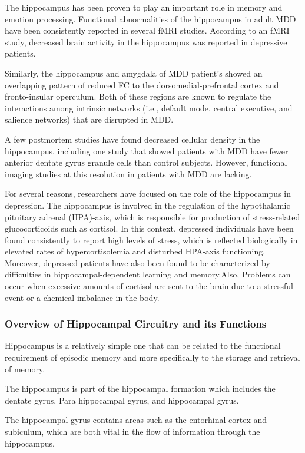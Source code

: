 \documentclass{article}
\begin{document}
The hippocampus has been proven to play an important role in memory
and emotion processing. Functional abnormalities of the hippocampus in
adult MDD have been consistently reported in several fMRI studies.
According to an fMRI study, decreased brain activity in the
hippocampus was reported in depressive patients.

Similarly, the hippocampus and amygdala of MDD patient’s showed an
overlapping pattern of reduced FC to the dorsomedial-prefrontal cortex
and fronto-insular operculum. Both of these regions are known to
regulate the interactions among intrinsic networks (i.e., default
mode, central executive, and salience networks) that are disrupted in
MDD.

A few postmortem studies have found decreased cellular density in the
hippocampus, including one study that showed patients with MDD have
fewer anterior dentate gyrus granule cells than control subjects.
However, functional imaging studies at this resolution in patients
with MDD are lacking.

For several reasons, researchers have focused on the role of the
hippocampus in depression. The  hippocampus is involved in the
regulation of the hypothalamic pituitary adrenal (HPA)-axis, which is
responsible for production of stress-related glucocorticoids such as
cortisol. In this context, depressed individuals have been found
consistently to report high levels of stress, which is reflected
biologically in elevated rates of hypercortisolemia and disturbed
HPA-axis functioning. Moreover, depressed patients have also been
found to be characterized by difficulties in hippocampal-dependent
learning  and  memory.Also, Problems  can occur  when excessive
amounts  of  cortisol  are  sent to  the  brain due  to  a stressful
event  or  a chemical imbalance in the body.

\subsubsection{Overview of Hippocampal Circuitry and its Functions}

Hippocampus is a relatively simple one that can be related to the
functional requirement of episodic memory and more specifically to the
storage and retrieval of memory.

The hippocampus is part of the hippocampal formation which includes
the dentate gyrus, Para hippocampal gyrus, and hippocampal gyrus.

The hippocampal gyrus contains areas such as the entorhinal cortex and
subiculum, which are both vital in the flow of information through the
hippocampus.
\end{document}
